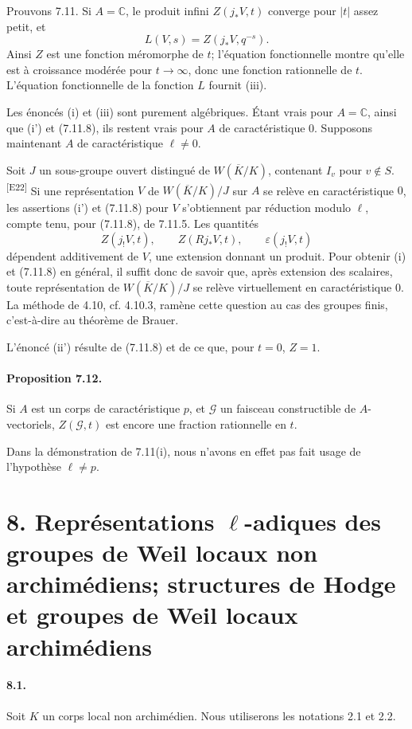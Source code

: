 \documentclass[10pt,letterpaper]{article}
\newcommand{\C}{\mathbb C}
\newcommand{\auditmark}[1]{\textsuperscript{\normalfont\scriptsize[E#1]}}
\begin{document}
Prouvons 7.11. Si \(A=\C\), le produit infini \(Z(j_*V,t)\) converge pour \(|t|\) assez petit, et
\[
L(V,s)=Z(j_*V,q^{-s}).
\]
Ainsi \(Z\) est une fonction méromorphe de \(t\); l'équation fonctionnelle montre qu'elle est à croissance modérée pour \(t\to\infty\), donc une fonction rationnelle de \(t\). L'équation fonctionnelle de la fonction \(L\) fournit (iii).

Les énoncés (i) et (iii) sont purement algébriques. Étant vrais pour \(A=\C\), ainsi que (i') et (7.11.8), ils restent vrais pour \(A\) de caractéristique \(0\). Supposons maintenant \(A\) de caractéristique \(\ell\ne0\).

Soit \(J\) un sous-groupe ouvert distingué de \(W(\overline K/K)\), contenant \(I_v\) pour \(v\notin S\).\auditmark{22} Si une représentation \(V\) de \(W(\overline K/K)/J\) sur \(A\) se relève en caractéristique \(0\), les assertions (i') et (7.11.8) pour \(V\) s'obtiennent par réduction modulo \(\ell\), compte tenu, pour (7.11.8), de 7.11.5. Les quantités
\[
Z(j_!V,t),\qquad Z(Rj_*V,t),\qquad \varepsilon(j_!V,t)
\]
dépendent additivement de \(V\), une extension donnant un produit. Pour obtenir (i) et (7.11.8) en général, il suffit donc de savoir que, après extension des scalaires, toute représentation de \(W(\overline K/K)/J\) se relève virtuellement en caractéristique \(0\). La méthode de 4.10, cf. 4.10.3, ramène cette question au cas des groupes finis, c'est-à-dire au théorème de Brauer.

L'énoncé (ii') résulte de (7.11.8) et de ce que, pour \(t=0\), \(Z=1\).

\paragraph{Proposition 7.12.} Si \(A\) est un corps de caractéristique \(p\), et \(\mathcal G\) un faisceau constructible de \(A\)-vectoriels, \(Z(\mathcal G,t)\) est encore une fraction rationnelle en \(t\).

Dans la démonstration de 7.11(i), nous n'avons en effet pas fait usage de l'hypothèse \(\ell\ne p\).

\section*{8. Représentations \(\ell\)-adiques des groupes de Weil locaux non archimédiens; structures de Hodge et groupes de Weil locaux archimédiens}

\paragraph{8.1.} Soit \(K\) un corps local non archimédien. Nous utiliserons les notations 2.1 et 2.2.
\end{document}
